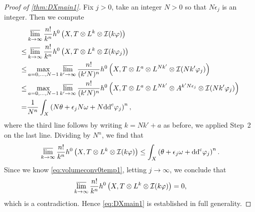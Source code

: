 \begin{proof}[Proof of \cref{thm:DXmain1}]
    Fix $j>0$, take an integer $N>0$ so that $N\epsilon_j$ is an integer. Then we compute
    \[
    \begin{aligned}
    &\varlimsup_{k\to\infty} \frac{n!}{k^n}h^0\left(X,T\otimes L^k\otimes \mathcal{I}(k\varphi)\right)\\
    \leq & \varlimsup_{k\to\infty} \frac{n!}{k^n}h^0\left(X,T\otimes L^k\otimes \mathcal{I}(k\varphi_j)\right)\\
    \leq & \max_{a=0,\ldots,N-1}\varlimsup_{k'\to\infty} \frac{n!}{(k'N)^n}h^0\left(X,T\otimes L^a\otimes L^{Nk'}\otimes \mathcal{I}(Nk'\varphi_j)\right)\\
    \leq & \max_{a=0,\ldots,N-1}\varlimsup_{k'\to\infty} \frac{n!}{(k'N)^n}h^0\left(X,T\otimes L^a\otimes L^{Nk'}\otimes A^{k'N\epsilon_j}\otimes \mathcal{I}(Nk'\varphi_j)\right)\\
    =& \frac{1}{N^n}\int_X \left( N\theta+\epsilon_jN\omega+N\mathrm{dd}^{\mathrm{c}} \varphi_j \right)^n,
    \end{aligned}
    \]
    where the third line follows by writing $k=Nk'+a$ as before,
    we applied Step~2 on the last line. Dividing by $N^n$, we find that
    \[
    \varlimsup_{k\to\infty} \frac{n!}{k^n}h^0\left(X,T\otimes L^k\otimes \mathcal{I}(k\varphi)\right)\leq \int_X \left(\theta+\epsilon_j\omega+\mathrm{dd}^{\mathrm{c}} \varphi_j\right)^n.
    \]
    Since we know \eqref{eq:volumeconv0temp1}, letting $j\to\infty$, we conclude that
    \[
    \varlimsup_{k\to\infty} \frac{n!}{k^n}h^0\left(X,T\otimes L^k\otimes \mathcal{I}(k\varphi)\right)=0,
    \]
    which is a contradiction. Hence \eqref{eq:DXmain1} is established in full generality.
 \end{proof}


